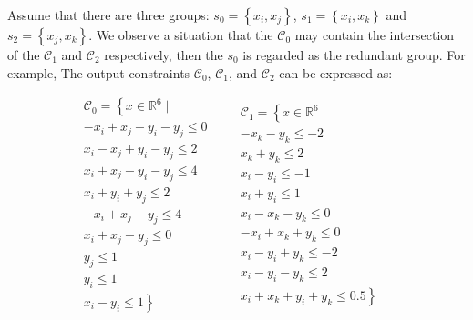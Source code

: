 \documentclass[runningheads]{llncs}
\begin{document}
Assume that there are three groups: $s_{0}=\left\{x_{i},x_{j} \right\}$, $s_{1}=\left\{x_{i},x_{k} \right\}$ and $s_{2}=\left\{x_{j},x_{k} \right\}$. We observe a situation that the $\mathcal{C}_{0}$ may contain the intersection of the $\mathcal{C}_{1}$ and $\mathcal{C}_{2}$ respectively, then the $s_{0}$ is regarded as the redundant group. For example,  The output constraints $\mathcal{C}_{0} $, $\mathcal{C}_{1}$, and $\mathcal{C}_{2} $ can be expressed as: 

\begin{equation*}
     \begin{aligned}
     &\mathcal{C}_{0}=\left\{x\in \mathbb{R}^{6}\mid \right. \\
                    &-x_{i}+x_{j}-y_{i}-y_{j} \leq 0 \\
                    &x_{i}-x_{j}+y_{i}-y_{j} \leq 2 \\
                    &x_{i}+x_{j}-y_{i}-y_{j} \leq 4\\ 
                    &x_{i}+y_{i}+y_{j} \leq 2\\ 
                    &-x_{i}+x_{j}-y_{j} \leq 4\\ 
                    &x_{i}+x_{j}-y_{j} \leq 0\\ 
                    &y_{j} \leq 1\\ 
                    &y_{i} \leq 1\\ 
                    &x_{i}-y_{i} \leq 1\left.\right\}
	\end{aligned}
     \quad
     \begin{aligned}
     &\mathcal{C}_{1}=\left\{x\in \mathbb{R}^{6}\mid \right. \\
                    &-x_{k}-y_{k} \leq -2 \\
                    &x_{k}+y_{k} \leq 2 \\
                    &x_{i}-y_{i} \leq -1\\ 
                    &x_{i}+y_{i} \leq 1\\                    
                    &x_{i}-x_{k}-y_{k} \leq 0\\ 
                    &-x_{i}+x_{k}+y_{k} \leq 0\\   
                    &x_{i}-y_{i}+y_{k} \leq -2\\
                    &x_{i}-y_{i}-y_{k} \leq 2\\ 
                    &x_{i}+x_{k}+y_{i}+y_{k} \leq 0.5\left.\right\}
	\end{aligned}
     \quad
     \begin{aligned}

\end{aligned}
\end{equation*}
\end{document}
